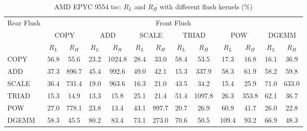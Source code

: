 \begin{table}[htbp]
\centering
\caption{AMD EPYC 9554 tsc: $R_L$ and $R_H$ with different flush kernels (\%)}
\label{tab:frkern-camd9554n2-tsc}
\begin{tabular*}{\textwidth}{@{\extracolsep{\fill}}lcccccccccccc}
\toprule
\multirow{3}{*}{Rear Flush} & \multicolumn{12}{c}{Front Flush} \\ \cmidrule(lr){2-13}
& \multicolumn{2}{c}{COPY} & \multicolumn{2}{c}{ADD} & \multicolumn{2}{c}{SCALE} & \multicolumn{2}{c}{TRIAD} & \multicolumn{2}{c}{POW} & \multicolumn{2}{c}{DGEMM} \\ \cmidrule(lr){2-3} \cmidrule(lr){4-5} \cmidrule(lr){6-7} \cmidrule(lr){8-9} \cmidrule(lr){10-11} \cmidrule(lr){12-13}
& $R_L$ & $R_H$ & $R_L$ & $R_H$ & $R_L$ & $R_H$ & $R_L$ & $R_H$ & $R_L$ & $R_H$ & $R_L$ & $R_H$ \\ \midrule
COPY & 56.8 & 55.6 & 23.2 & 1024.8 & 28.4 & 33.0 & 58.4 & 53.5 & 17.3 & 16.8 & 16.1 & 36.9 \\
ADD & 37.3 & 896.7 & 45.4 & 992.6 & 49.0 & 42.1 & 15.3 & 337.9 & 58.3 & 61.9 & 58.2 & 59.8 \\
SCALE & 36.4 & 731.4 & 19.0 & 963.6 & 16.3 & 21.0 & 43.5 & 34.2 & 15.4 & 25.9 & 71.0 & 633.0 \\
TRIAD & 15.3 & 14.9 & 13.3 & 15.8 & 25.1 & 21.4 & 51.4 & 1097.8 & 26.3 & 353.8 & 62.1 & 36.7 \\
POW & 27.0 & 778.1 & 23.8 & 13.4 & 43.1 & 997.7 & 20.7 & 26.9 & 60.9 & 41.7 & 26.0 & 22.8 \\
DGEMM & 58.3 & 45.5 & 80.2 & 83.4 & 73.1 & 273.0 & 70.6 & 50.5 & 109.4 & 93.2 & 66.9 & 48.3 \\
\bottomrule
\end{tabular*}
\end{table}